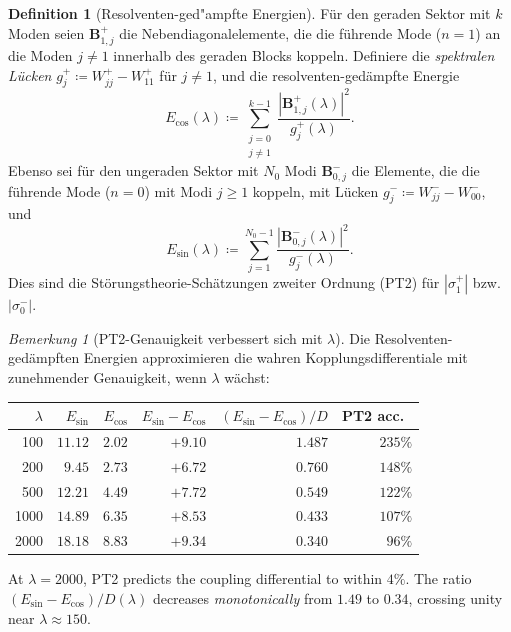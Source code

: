 ﻿\documentclass[12pt,a4paper]{article}
\theoremstyle{definition}
\newtheorem{definition}[theorem]{Definition}
\theoremstyle{remark}
\newtheorem{remark}[theorem]{Bemerkung}
\begin{document}
\begin{definition}[Resolventen-ged"ampfte Energien]
\label{def:resolvent-energies}
Für den geraden Sektor mit $k$ Moden seien $\mathbf{B}^+_{1,j}$ die Nebendiagonalelemente, die die führende Mode ($n=1$) an die Moden $j \neq 1$ innerhalb des geraden Blocks koppeln. Definiere die \emph{spektralen Lücken} $g_j^+ \coloneqq W_{jj}^+ - W_{11}^+$ für $j \neq 1$, und die resolventen-gedämpfte Energie
\[
  E_{\cos}(\lambda) \coloneqq \sum_{\substack{j=0 \\ j \neq 1}}^{k-1} \frac{|\mathbf{B}^+_{1,j}(\lambda)|^2}{g_j^+(\lambda)}.
\]
Ebenso sei für den ungeraden Sektor mit $N_0$ Modi $\mathbf{B}^-_{0,j}$ die Elemente, die die führende Mode ($n=0$) mit Modi $j \geq 1$ koppeln, mit Lücken $g_j^- \coloneqq W_{jj}^- - W_{00}^-$, und
\[
  E_{\sin}(\lambda) \coloneqq \sum_{j=1}^{N_0-1} \frac{|\mathbf{B}^-_{0,j}(\lambda)|^2}{g_j^-(\lambda)}.
\]
Dies sind die Störungstheorie-Schätzungen zweiter Ordnung (PT2) für $|\sigma_1^+|$ bzw. $|\sigma_0^-|$.
\end{definition}

\begin{remark}[PT2-Genauigkeit verbessert sich mit $\lambda$]
Die Resolventen-gedämpften Energien approximieren die wahren Kopplungsdifferentiale mit zunehmender Genauigkeit, wenn $\lambda$ wächst:

\begin{center}
\small
\renewcommand{\arraystretch}{1.15}
\begin{tabular}{r|rr|rr|r}
$\lambda$ & $E_{\sin}$ & $E_{\cos}$ & $E_{\sin}-E_{\cos}$ & $(E_{\sin}-E_{\cos})/D$ & PT2 acc.\ \\\hline
100  & $11.12$ & $2.02$ & $+9.10$ & $1.487$ & $235\%$ \\
200  & $9.45$  & $2.73$ & $+6.72$ & $0.760$ & $148\%$ \\
500  & $12.21$ & $4.49$ & $+7.72$ & $0.549$ & $122\%$ \\
1000 & $14.89$ & $6.35$ & $+8.53$ & $0.433$ & $107\%$ \\
2000 & $18.18$ & $8.83$ & $+9.34$ & $0.340$ & $96\%$
\end{tabular}
\end{center}

\noindent At $\lambda = 2000$, PT2 predicts the coupling differential to within $4\%$. The ratio $(E_{\sin} - E_{\cos})/D(\lambda)$ decreases \emph{monotonically} from $1.49$ to $0.34$, crossing unity near $\lambda \approx 150$.
\end{remark}
\end{document}
